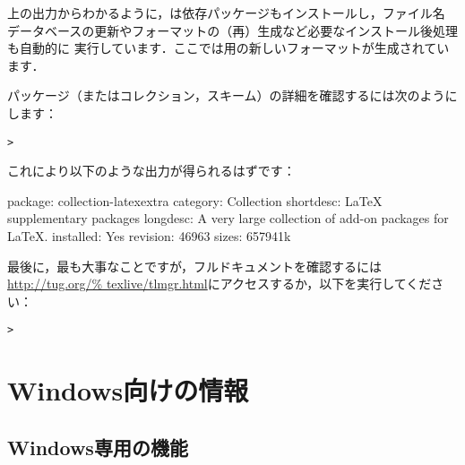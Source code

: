\documentclass[uplatex,dvipdfmx]{jsarticle}
\begin{document}
上の出力からわかるように，は依存パッケージもインストールし，ファイル名
データベースの更新やフォーマットの（再）生成など必要なインストール後処理も自動的に
実行しています．ここでは\XeTeX 用の新しいフォーマットが生成されています．

パッケージ（またはコレクション，スキーム）の詳細を確認するには次のようにします：
%
\begin{alltt}
> 
\end{alltt}
%
これにより以下のような出力が得られるはずです：
%
\begin{fverbatim}
package:    collection-latexextra
category:   Collection
shortdesc:  LaTeX supplementary packages
longdesc:   A very large collection of add-on packages for LaTeX.
installed:  Yes
revision:   46963
sizes:      657941k
\end{fverbatim}
%
最後に，最も大事なことですが，フルドキュメントを確認するには\url{http://tug.org/%
texlive/tlmgr.html}にアクセスするか，以下を実行してください：
%
\begin{alltt}
> 
\end{alltt}

\section{Windows向けの情報}
\label{sec:windows}

\subsection{Windows専用の機能}
\label{sec:winfeatures}
\end{document}
